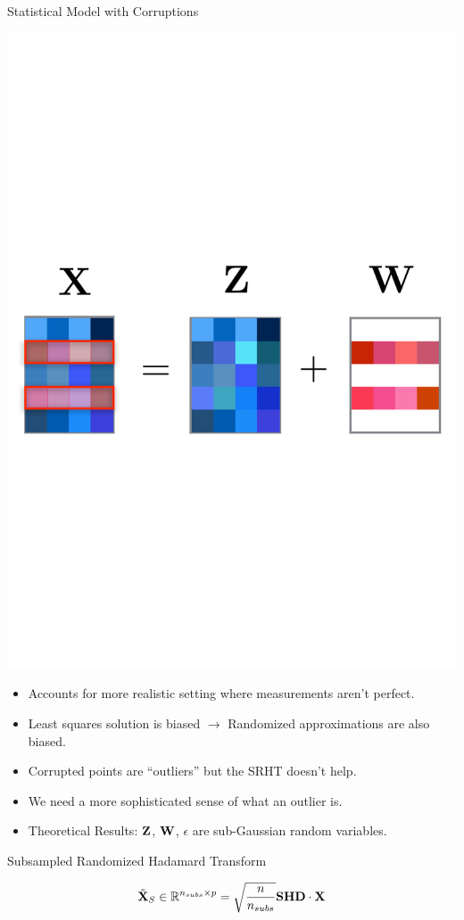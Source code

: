 \documentclass[final,t,english,professionalfonts, xcolor=dvipsnames]{beamer}
\begin{document}
\begin{frame}{}
{\begin{minipage}[c]{0.96\linewidth}
\begin{columns}[t]
\begin{column}{.33\linewidth}
\begin{block}{Statistical Model with Corruptions}
\vspace{0.23cm}
\begin{minipage}[b]{1\linewidth}
\begin{center}
  \includegraphics[width=0.65\linewidth]{figures/nips_spotlight_corrupted}
  \end{center}
\end{minipage}
\begin{itemize}
\setlength{\itemsep}{0.5cm}
\item Accounts for more realistic setting where measurements aren't perfect.
\item Least squares solution is biased $\rightarrow$ Randomized approximations are also biased.
\item Corrupted points are ``outliers'' but the SRHT doesn't help.
\item We need a more sophisticated sense of what an outlier is.
\item Theoretical Results: ${\mathbf{Z}}$, ${\mathbf{W}}$, $\epsilon$ are sub-Gaussian random variables.
\end{itemize}


\end{block}


\begin{block}{Subsampled Randomized Hadamard Transform}

$$
\tilde{{\mathbf{X}}}_{S}\in{\mathbb R}^{n_{subs}\times p} = \sqrt{\frac{n}{n_{subs}}} {\mathbf{S}}{\mathbf{H}}{\mathbf{D}} \cdot {\mathbf{X}}
$$



\end{block}
\end{column}
\end{columns}
\end{minipage}}
\end{frame}
\end{document}
